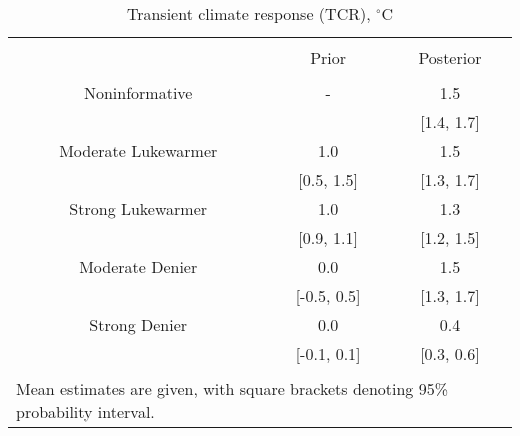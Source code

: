 
\begin{table}[!htbp] \centering 
  \caption{Transient climate response (TCR), $^\circ$C} 
  \label{tab:tcr-tab} 
\begin{tabular}{@{\extracolsep{5pt}} ccc} 
\\[-1.8ex]\hline 
\hline \\[-1.8ex] 
 & Prior & Posterior \\ 
\hline \\[-1.8ex] 
Noninformative & - & 1.5 \\ 
 &  & [1.4, 1.7] \\ 
Moderate Lukewarmer & 1.0 & 1.5 \\ 
 & [0.5, 1.5] & [1.3, 1.7] \\ 
Strong Lukewarmer & 1.0 & 1.3 \\ 
 & [0.9, 1.1] & [1.2, 1.5] \\ 
Moderate Denier & 0.0 & 1.5 \\ 
 & [-0.5, 0.5] & [1.3, 1.7] \\ 
Strong Denier & 0.0 & 0.4 \\ 
 & [-0.1, 0.1] & [0.3, 0.6] \\ 
\hline \\[-1.8ex] 
\multicolumn{3}{l}{\footnotesize Mean estimates are given, with square brackets denoting 95\% probability interval.} \\ 
\end{tabular} 
\end{table} 
